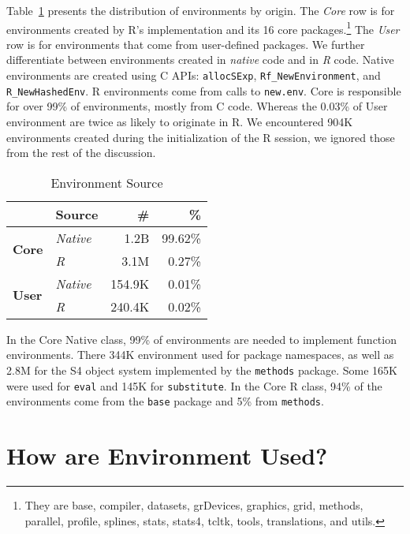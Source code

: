 \documentclass[10pt,review,sigplan,authorversion=true]{acmart}
\renewcommand{\c}[1]{\lstinline |#1|\xspace}
\newcommand{\newEnv}{\c{new.env}}
\begin{document}
Table~\ref{table:env_source} presents the distribution of environments by
origin. The \emph{Core} row is for environments created by R's implementation
and its 16 core packages.\footnote{They are base, compiler, {datasets},
{grDevices}, {graphics}, {grid}, {methods}, {parallel}, {profile}, {splines},
{stats}, {stats4}, {tcltk}, {tools}, {translations}, and {utils.}} The
\emph{User} row is for environments that come from user-defined packages. We
further differentiate between environments created in \emph{native} code and in
\emph{R} code. Native environments are created using C APIs: \c{allocSExp},
\c{Rf_NewEnvironment}, and \c{R_NewHashedEnv}. R environments come from calls
to \newEnv. Core is responsible for over 99\% of environments, mostly from C
code. Whereas the 0.03\% of User environment are twice as likely to originate in
R. We encountered 904K environments created during the initialization of the R
session, we ignored those from the rest of the discussion.

\begin{table}[!h]\small\centering
  \caption{Environment Source}\label{table:env_source}
  \begin{tabular}{llrr}\toprule
  &\textbf{Source}&\textbf{\#}&\textbf{\%}\\\midrule
\multirow{2}{*}{\textbf{Core}}&\multicolumn{1}{l}{\emph{Native}}&\multicolumn{1}{r}{1.2B}&\multicolumn{1}{r}{99.62\%}\\
                               & \multicolumn{1}{l}{\emph{R}}     & \multicolumn{1}{r}{3.1M} & \multicolumn{1}{r}{0.27\%}\\\midrule
\multirow{2}{*}{\textbf{User}}  & \multicolumn{1}{l}{\emph{Native}} & \multicolumn{1}{r}{154.9K} & \multicolumn{1}{r}{0.01\%}\\
                                & \multicolumn{1}{l}{\emph{R}}      & \multicolumn{1}{r}{240.4K} & \multicolumn{1}{r}{0.02\%}\\\bottomrule
  \end{tabular}
\end{table}

\noindent
In the Core Native class, 99\% of environments are needed to implement function
environments. There 344K environment used for package namespaces, as well as
2.8M for the S4 object system implemented by the \c{methods} package. Some 165K
were used for \c{eval} and 145K for \c{substitute}. In the Core R class, 94\% of
the environments come from the \c{base} package and 5\% from \c{methods}.


\section{How are Environment Used?}
\end{document}
